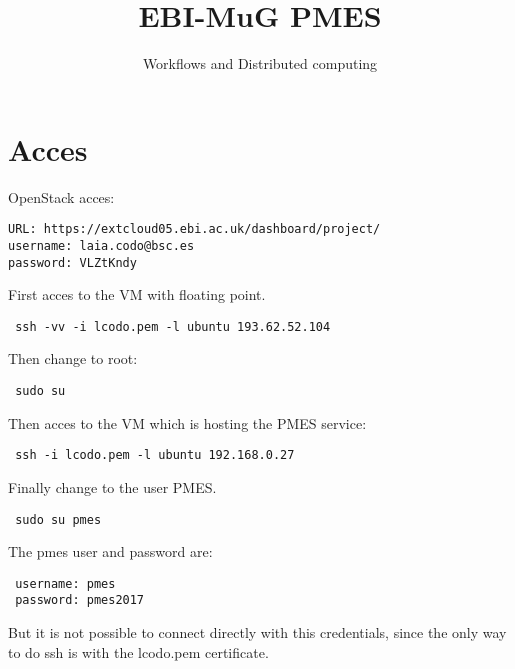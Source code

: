 \documentclass[a4paper,10pt]{article}
\title{EBI-MuG PMES}
\author{Workflows and Distributed computing}
\begin{document}
\maketitle

\section{Acces}
OpenStack acces:
\begin{verbatim}
URL: https://extcloud05.ebi.ac.uk/dashboard/project/
username: laia.codo@bsc.es
password: VLZtKndy
\end{verbatim}

First acces to the VM with floating point.
\begin{verbatim}
 ssh -vv -i lcodo.pem -l ubuntu 193.62.52.104
\end{verbatim}
Then change to root:
\begin{verbatim}
 sudo su
\end{verbatim}
Then acces to the VM which is hosting the PMES service:
\begin{verbatim}
 ssh -i lcodo.pem -l ubuntu 192.168.0.27
\end{verbatim}
Finally change to the user PMES.
\begin{verbatim}
 sudo su pmes
\end{verbatim}

The pmes user and password are:
\begin{verbatim}
 username: pmes
 password: pmes2017
\end{verbatim}
But it is not possible to connect directly with this credentials, since the only way to do ssh is with the lcodo.pem certificate.
\end{document}
